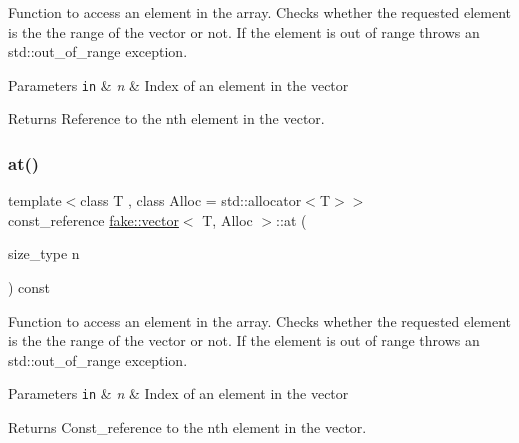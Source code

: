 Function to access an element in the array. Checks whether the requested element is the the range of the vector or not. If the element is out of range throws an std\+::out\+\_\+of\+\_\+range exception. 


\begin{DoxyParams}[1]{Parameters}
\mbox{\tt in}  & {\em n} & Index of an element in the vector\\
\hline
\end{DoxyParams}
\begin{DoxyReturn}{Returns}
Reference to the n\textquotesingle{}th element in the vector. 
\end{DoxyReturn}
\mbox{\label{classfake_1_1vector_a471d597c2a40234bbe86179b97d0dcbf}} 
\subsubsection{\texorpdfstring{at()}{at()}\hspace{0.1cm}{\footnotesize\ttfamily [2/2]}}
{\footnotesize\ttfamily template$<$class T , class Alloc  = std\+::allocator$<$\+T$>$$>$ \\
const\+\_\+reference \mbox{\hyperlink{classfake_1_1vector}{fake\+::vector}}$<$ T, Alloc $>$\+::at (\begin{DoxyParamCaption}\item[{size\+\_\+type}]{n }\end{DoxyParamCaption}) const\hspace{0.3cm}{\ttfamily [inline]}}



Function to access an element in the array. Checks whether the requested element is the the range of the vector or not. If the element is out of range throws an std\+::out\+\_\+of\+\_\+range exception. 


\begin{DoxyParams}[1]{Parameters}
\mbox{\tt in}  & {\em n} & Index of an element in the vector\\
\hline
\end{DoxyParams}
\begin{DoxyReturn}{Returns}
Const\+\_\+reference to the n\textquotesingle{}th element in the vector. 
\end{DoxyReturn}
\mbox{\label{classfake_1_1vector_a4c67f42f60eb6ea322065aa6c87315b7}} 
